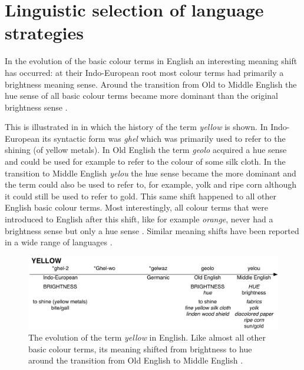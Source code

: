 \chapter{Linguistic selection of language strategies}
\label{s:strategy-selection}

\setcounter{figure}{2}

In the evolution of the basic colour terms in English an interesting
meaning shift has occurred: at their Indo-European root most colour
terms had primarily a brightness meaning sense. Around the transition
from Old to Middle English the hue sense of all basic colour terms
became more dominant than the original brightness sense
\citep{casson97shift}.

This is illustrated in  in which the
history of the term \textit{yellow} is shown. In Indo-European its
syntactic form was \textit{ghel} which was primarily used to refer to the
shining (of yellow metals). In Old English the term \textit{geolo} acquired
a hue sense and could be used for example to refer to the colour of
some silk cloth. In the transition to Middle English \textit{yelou} the hue
sense became the more dominant and the term could also be used to
refer to, for example, yolk and ripe corn although it could still be
used to refer to gold. This same shift happened to all other English
basic colour terms. Most interestingly, all colour terms that were
introduced to English after this shift, like for example \textit{orange},
never had a brightness sense but only a hue sense
\citep{casson97shift}. Similar meaning shifts have been reported in a
wide range of languages \citep{maclaury92brightness}.

\begin{figure}[htbp]
  \begin{center}
    \includegraphics[width=\textwidth]{./selection/figures/history-yellow.pdf}
   \caption[The evolution of the term \textit{yellow} in English]{The
     evolution of the term \textit{yellow} in English. Like almost all
     other basic colour terms, its meaning shifted from brightness to
     hue around the transition from Old English to Middle
     English \citep{casson97shift}.}
    \label{f:ls-history-yellow}
  \end{center}
\end{figure}

